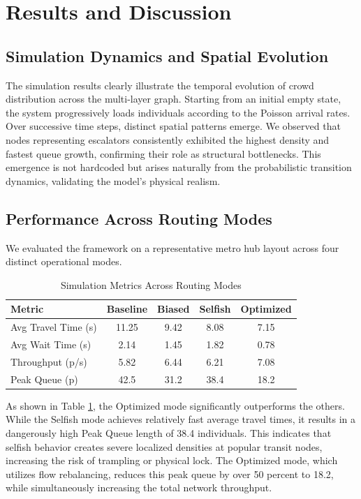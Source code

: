 \documentclass[conference]{IEEEtran}
\begin{document}
\section{Results and Discussion}

\subsection{Simulation Dynamics and Spatial Evolution}
The simulation results clearly illustrate the temporal evolution of crowd distribution across the multi-layer graph. Starting from an initial empty state, the system progressively loads individuals according to the Poisson arrival rates. Over successive time steps, distinct spatial patterns emerge. We observed that nodes representing escalators consistently exhibited the highest density and fastest queue growth, confirming their role as structural bottlenecks. This emergence is not hardcoded but arises naturally from the probabilistic transition dynamics, validating the model's physical realism.

\subsection{Performance Across Routing Modes}
We evaluated the framework on a representative metro hub layout across four distinct operational modes.

\begin{table}[htbp]
\centering
\caption{Simulation Metrics Across Routing Modes}
\label{tab:metrics}
\begin{tabular}{l c c c c}
\toprule
\textbf{Metric} & \textbf{Baseline} & \textbf{Biased} & \textbf{Selfish} & \textbf{Optimized} \\
\midrule
Avg Travel Time (s) & 11.25 & 9.42 & 8.08 & 7.15 \\
Avg Wait Time (s) & 2.14 & 1.45 & 1.82 & 0.78 \\
Throughput (p/s) & 5.82 & 6.44 & 6.21 & 7.08 \\
Peak Queue (p) & 42.5 & 31.2 & 38.4 & 18.2 \\
\bottomrule
\end{tabular}
\end{table}

As shown in Table \ref{tab:metrics}, the Optimized mode significantly outperforms the others. While the Selfish mode achieves relatively fast average travel times, it results in a dangerously high Peak Queue length of 38.4 individuals. This indicates that selfish behavior creates severe localized densities at popular transit nodes, increasing the risk of trampling or physical lock. The Optimized mode, which utilizes flow rebalancing, reduces this peak queue by over 50 percent to 18.2, while simultaneously increasing the total network throughput.
\end{document}

